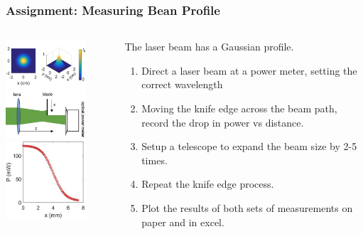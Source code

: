 \documentclass{beamer}
\begin{document}
\begin{frame}\frametitle{Assignment: Measuring Bean Profile}
\begin{columns}
\begin{column}{4cm}
\begin{center}
\includegraphics[width=3cm]{fig/profile1.jpg}
\includegraphics[width=3cm]{fig/profile2.jpg}
\end{center}
\end{column}
\begin{column}{7cm}
The laser beam has a Gaussian profile.
\begin{enumerate}
\item Direct a laser beam at a power meter, setting the correct wavelength
\item Moving the knife edge across the beam path, record the drop in power vs distance.
\item Setup a telescope to expand the beam size by 2-5 times.
\item Repeat the knife edge process.
\item Plot the results of both sets of measurements on paper and in excel.
\end{enumerate}
\end{column}
\end{columns}
\end{frame}
\end{document}
